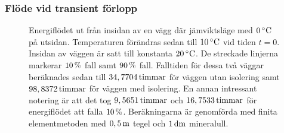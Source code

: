 \subsubsection{Flöde vid transient förlopp}


\begin{figure}
\centering

\vspace{5mm}
\caption{Energiflödet ut från insidan av en vägg där jämviktsläge med
$\unit[0]{^\circ C}$ på utsidan. Temperaturen förändras sedan
till $\unit[10]{^\circ C}$ vid tiden $t=0$. Insidan av väggen är satt till
konstanta $\unit[20]{^\circ C}$. De streckade linjerna markerar $\unit[10]{\%}$
fall samt $\unit[90]{\%}$ fall. Falltiden för dessa två väggar beräknades sedan
till $\unit[34,7704]{ timmar}$ för väggen utan isolering samt
$\unit[98,8372]{ timmar}$ för väggen med isolering. En annan intressant notering
är att det tog $\unit[9,5651]{ timmar}$ och $\unit[16,7533]{ timmar}$ för
energiflödet att falla $\unit[10]{\%}$. Beräkningarna är genomförda med finita
elementmetoden med $\unit[0,5]{m}$ tegel och $\unit[1]{dm}$ mineralull.}
\end{figure}
